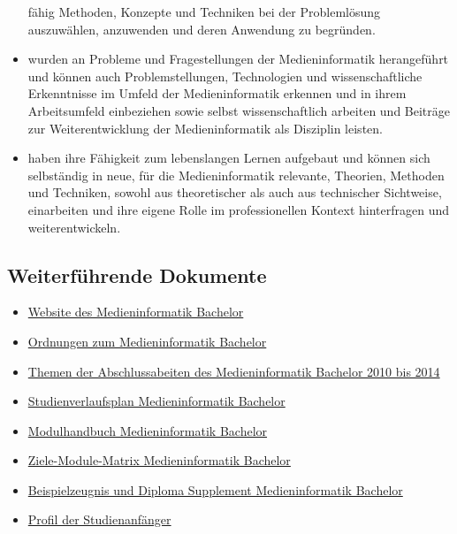 \begin{itemize}
  fähig Methoden, Konzepte und Techniken bei der Problemlösung
  auszuwählen, anzuwenden und deren Anwendung zu begründen.
\item
  wurden an Probleme und Fragestellungen der Medieninformatik
  herangeführt und können auch Problemstellungen, Technologien und
  wissenschaftliche Erkenntnisse im Umfeld der Medieninformatik erkennen
  und in ihrem Arbeitsumfeld einbeziehen sowie selbst wissenschaftlich
  arbeiten und Beiträge zur Weiterentwicklung der Medieninformatik als
  Disziplin leisten.
\item
  haben ihre Fähigkeit zum lebenslangen Lernen aufgebaut und können sich
  selbständig in neue, für die Medieninformatik relevante, Theorien,
  Methoden und Techniken, sowohl aus theoretischer als auch aus
  technischer Sichtweise, einarbeiten und ihre eigene Rolle im
  professionellen Kontext hinterfragen und weiterentwickeln.
\end{itemize}

\subsection{Weiterführende
Dokumente\label{/mi-2017/selbstbericht/0200-qualifikationsziele/0000-qualifikationsziele}}\label{weiterfuxfchrende-dokumentepathlabelmi-2017selbstbericht0200-qualifikationsziele0000-qualifikationsziele}

\begin{itemize}
\tightlist
\item
  \href{https://www.th-koeln.de/studium/medieninformatik-bachelor_2379.php}{Website
  des Medieninformatik Bachelor}
\item
  \href{https://www.th-koeln.de/studium/medieninformatik-bachelor--ordnungen-und-formulare_3963.php}{Ordnungen
  zum Medieninformatik Bachelor}
\item
  \href{https://th-koeln.github.io/mi-2017/anhaenge/ba-abschlussarbeiten_2010-2014_.pdf}{Themen der
  Abschlussabeiten des Medieninformatik Bachelor 2010 bis 2014}
\item
  \href{https://th-koeln.github.io/mi-2017/anhaenge/ba-studienverlaufsplan.pdf}{Studienverlaufsplan
  Medieninformatik Bachelor}
\item
  \href{https://th-koeln.github.io/mi-2017/download/modulbeschreibungen-bachelor.pdf}{Modulhandbuch
  Medieninformatik Bachelor}
\item
  \href{https://th-koeln.github.io/mi-2017/anhaenge/ba-Ziele-Module-Matrix-Medieninformatik-Bachelor.pdf}{Ziele-Module-Matrix
  Medieninformatik Bachelor}
\item
  \href{https://th-koeln.github.io/mi-2017/anhaenge/ba-zeugnis.pdf}{Beispielzeugnis und Diploma
  Supplement Medieninformatik Bachelor}
\item
  \href{https://th-koeln.github.io/mi-2017/anhaenge/stat-profil-studienanfaenger-2017.pdf}{Profil der
  Studienanfänger}
\end{itemize}


